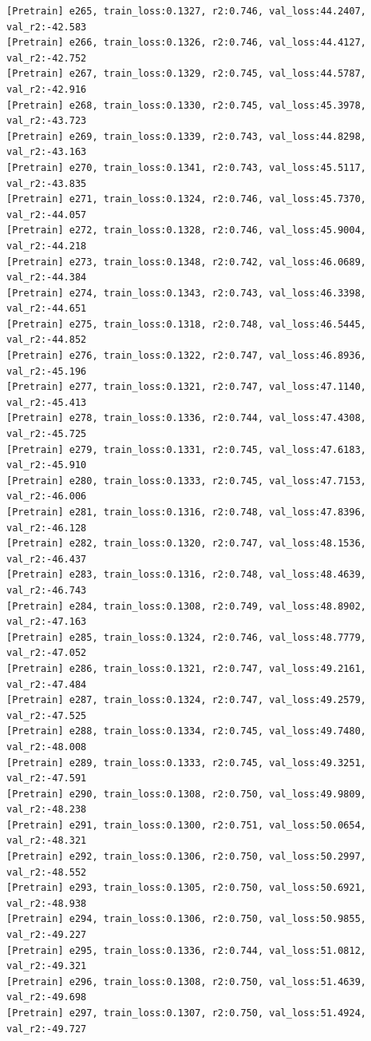 \documentclass[a4paper, 12pt]{article}
\begin{document}
\begin{lstlisting}
[Pretrain] e265, train_loss:0.1327, r2:0.746, val_loss:44.2407, val_r2:-42.583
[Pretrain] e266, train_loss:0.1326, r2:0.746, val_loss:44.4127, val_r2:-42.752
[Pretrain] e267, train_loss:0.1329, r2:0.745, val_loss:44.5787, val_r2:-42.916
[Pretrain] e268, train_loss:0.1330, r2:0.745, val_loss:45.3978, val_r2:-43.723
[Pretrain] e269, train_loss:0.1339, r2:0.743, val_loss:44.8298, val_r2:-43.163
[Pretrain] e270, train_loss:0.1341, r2:0.743, val_loss:45.5117, val_r2:-43.835
[Pretrain] e271, train_loss:0.1324, r2:0.746, val_loss:45.7370, val_r2:-44.057
[Pretrain] e272, train_loss:0.1328, r2:0.746, val_loss:45.9004, val_r2:-44.218
[Pretrain] e273, train_loss:0.1348, r2:0.742, val_loss:46.0689, val_r2:-44.384
[Pretrain] e274, train_loss:0.1343, r2:0.743, val_loss:46.3398, val_r2:-44.651
[Pretrain] e275, train_loss:0.1318, r2:0.748, val_loss:46.5445, val_r2:-44.852
[Pretrain] e276, train_loss:0.1322, r2:0.747, val_loss:46.8936, val_r2:-45.196
[Pretrain] e277, train_loss:0.1321, r2:0.747, val_loss:47.1140, val_r2:-45.413
[Pretrain] e278, train_loss:0.1336, r2:0.744, val_loss:47.4308, val_r2:-45.725
[Pretrain] e279, train_loss:0.1331, r2:0.745, val_loss:47.6183, val_r2:-45.910
[Pretrain] e280, train_loss:0.1333, r2:0.745, val_loss:47.7153, val_r2:-46.006
[Pretrain] e281, train_loss:0.1316, r2:0.748, val_loss:47.8396, val_r2:-46.128
[Pretrain] e282, train_loss:0.1320, r2:0.747, val_loss:48.1536, val_r2:-46.437
[Pretrain] e283, train_loss:0.1316, r2:0.748, val_loss:48.4639, val_r2:-46.743
[Pretrain] e284, train_loss:0.1308, r2:0.749, val_loss:48.8902, val_r2:-47.163
[Pretrain] e285, train_loss:0.1324, r2:0.746, val_loss:48.7779, val_r2:-47.052
[Pretrain] e286, train_loss:0.1321, r2:0.747, val_loss:49.2161, val_r2:-47.484
[Pretrain] e287, train_loss:0.1324, r2:0.747, val_loss:49.2579, val_r2:-47.525
[Pretrain] e288, train_loss:0.1334, r2:0.745, val_loss:49.7480, val_r2:-48.008
[Pretrain] e289, train_loss:0.1333, r2:0.745, val_loss:49.3251, val_r2:-47.591
[Pretrain] e290, train_loss:0.1308, r2:0.750, val_loss:49.9809, val_r2:-48.238
[Pretrain] e291, train_loss:0.1300, r2:0.751, val_loss:50.0654, val_r2:-48.321
[Pretrain] e292, train_loss:0.1306, r2:0.750, val_loss:50.2997, val_r2:-48.552
[Pretrain] e293, train_loss:0.1305, r2:0.750, val_loss:50.6921, val_r2:-48.938
[Pretrain] e294, train_loss:0.1306, r2:0.750, val_loss:50.9855, val_r2:-49.227
[Pretrain] e295, train_loss:0.1336, r2:0.744, val_loss:51.0812, val_r2:-49.321
[Pretrain] e296, train_loss:0.1308, r2:0.750, val_loss:51.4639, val_r2:-49.698
[Pretrain] e297, train_loss:0.1307, r2:0.750, val_loss:51.4924, val_r2:-49.727

\end{lstlisting}
\end{document}
